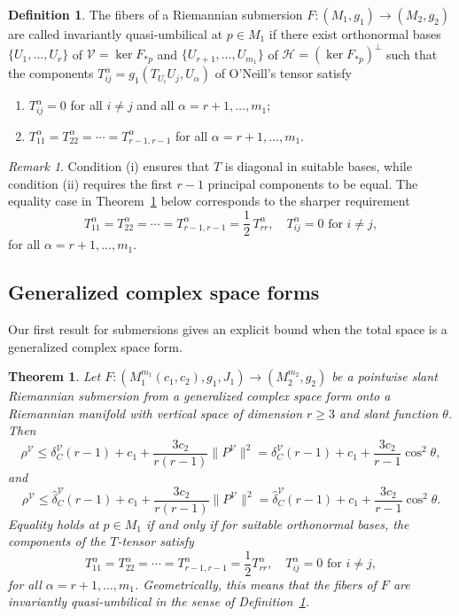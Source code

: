 \documentclass[11pt]{amsart}
\theoremstyle{plain}
\newtheorem{theorem}{Theorem}[section]
\theoremstyle{definition}
\newtheorem{definition}[proposition]{Definition}
\theoremstyle{remark}
\newtheorem{remark}[proposition]{Remark}
\newcommand{\calH}{\mathcal{H}}
\newcommand{\calV}{\mathcal{V}}
\begin{document}
\begin{definition}\label{def:quasi-umbilical}
The fibers of a Riemannian submersion $F:(M_1,g_1)\to(M_2,g_2)$ are called
{invariantly quasi-umbilical} at $p\in M_1$ if there exist orthonormal
bases $\{U_1,\ldots,U_r\}$ of $\calV=\ker F_{*p}$ and
$\{U_{r+1},\ldots,U_{m_1}\}$ of $\calH=(\ker F_{*p})^{\perp}$ such that the
components $T_{ij}^{\alpha}=g_1(T_{U_i}U_j,U_\alpha)$ of O'Neill's tensor
satisfy
\begin{enumerate}[label=(\roman*)]
\item $T_{ij}^\alpha = 0$ for all $i \neq j$ and all
      $\alpha = r+1, \ldots, m_1$;
\item $T_{11}^\alpha = T_{22}^\alpha = \cdots =
      T_{r-1,r-1}^\alpha$ for all $\alpha = r+1, \ldots, m_1$.
\end{enumerate}
\end{definition}

\begin{remark}\label{rem:quasi-umbilical}
Condition (i) ensures that $T$ is diagonal in suitable bases, while condition
(ii) requires the first $r-1$ principal components to be equal. The equality
case in Theorem~\ref{thm:complex_subm_vert} below corresponds to the sharper
requirement
\[
T_{11}^\alpha = T_{22}^\alpha = \cdots =
T_{r-1,r-1}^\alpha = \dfrac{1}{2}\,T_{rr}^\alpha, \quad
T_{ij}^\alpha = 0 \text{ for } i \neq j,
\]
for all $\alpha = r+1, \ldots, m_1$.
\end{remark}

\subsection{Generalized complex space forms}

Our first result for submersions gives an explicit bound when the 
total space is a generalized complex space form.
\begin{theorem}\label{thm:complex_subm_vert}
Let $F:(M_1^{m_1}(c_1,c_2),g_1,J_1)\to (M_2^{m_2},g_2)$ be a pointwise slant Riemannian submersion from a generalized complex space form onto a Riemannian manifold with vertical space of dimension $r\ge 3$ and slant function $\theta$. Then
\begin{equation}\label{eq:complex_subm_vert_delta}
\rho^{\calV} \le \delta_C^{\calV}(r-1) + c_1 + \dfrac{3c_2}{r(r-1)}\|P^{\mathcal V}\|^2 = \delta_C^{\calV}(r-1) + c_1 + \dfrac{3c_2}{r-1}\cos^2\theta,
\end{equation}
and
\begin{equation}\label{eq:complex_subm_vert_delta_hat}
\rho^{\calV} \le \hat{\delta}_C^{\calV}(r-1) + c_1 + \dfrac{3c_2}{r(r-1)}\|P^{\mathcal V}\|^2 = \hat{\delta}_C^{\calV}(r-1) + c_1 + \dfrac{3c_2}{r-1}\cos^2\theta.
\end{equation}
Equality holds at $p \in M_1$ if and only if for suitable orthonormal 
bases, the components of the $T$-tensor satisfy
\[
T_{11}^{\alpha} = T_{22}^{\alpha} = \cdots = T_{r-1,r-1}^{\alpha} 
= \dfrac{1}{2}T_{rr}^{\alpha}, \quad T_{ij}^{\alpha} = 0 \text{ for } i\neq j,
\]
for all $\alpha = r+1,\ldots,m_1$. Geometrically, this means that the 
fibers of $F$ are invariantly quasi-umbilical in the sense of 
Definition~\ref{def:quasi-umbilical}. 
\end{theorem}
\end{document}
